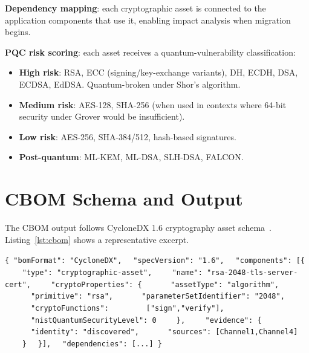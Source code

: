 \documentclass[sigconf,nonacm]{acmart}
\begin{document}
\textbf{Dependency mapping}: each cryptographic asset is connected
to the application components that use it, enabling impact analysis
when migration begins.

\textbf{PQC risk scoring}: each asset receives a quantum-vulnerability
classification:

\begin{itemize}
  \item \textbf{High risk}: RSA, ECC (signing/key-exchange variants),
        DH, ECDH, DSA, ECDSA, EdDSA. Quantum-broken under Shor's
        algorithm.
  \item \textbf{Medium risk}: AES-128, SHA-256 (when used in
        contexts where 64-bit security under Grover would be
        insufficient).
  \item \textbf{Low risk}: AES-256, SHA-384/512, hash-based
        signatures.
  \item \textbf{Post-quantum}: ML-KEM, ML-DSA, SLH-DSA, FALCON.
\end{itemize}

\section{CBOM Schema and Output}

The CBOM output follows CycloneDX 1.6 cryptography asset
schema~\cite{cyclonedx2024crypto}. Listing~\ref{lst:cbom} shows a
representative excerpt.

\begin{algorithm}[h]
\caption{Excerpt of CycloneDX 1.6 CBOM output (JSON, abbreviated)}
\label{lst:cbom}
\begin{algorithmic}
\STATE \texttt{\{ "bomFormat": "CycloneDX",}
\STATE \texttt{~~"specVersion": "1.6",}
\STATE \texttt{~~"components": [\{}
\STATE \texttt{~~~~"type": "cryptographic-asset",}
\STATE \texttt{~~~~"name": "rsa-2048-tls-server-cert",}
\STATE \texttt{~~~~"cryptoProperties": \{}
\STATE \texttt{~~~~~~"assetType": "algorithm",}
\STATE \texttt{~~~~~~"primitive": "rsa",}
\STATE \texttt{~~~~~~"parameterSetIdentifier": "2048",}
\STATE \texttt{~~~~~~"cryptoFunctions":}
\STATE \texttt{~~~~~~~~["sign","verify"],}
\STATE \texttt{~~~~~~"nistQuantumSecurityLevel": 0}
\STATE \texttt{~~~~\},}
\STATE \texttt{~~~~"evidence": \{}
\STATE \texttt{~~~~~~"identity": "discovered",}
\STATE \texttt{~~~~~~"sources": [Channel1,Channel4]}
\STATE \texttt{~~~~\}}
\STATE \texttt{~~\}],}
\STATE \texttt{~~"dependencies": [...] \}}
\end{algorithmic}
\end{algorithm}
\end{document}

